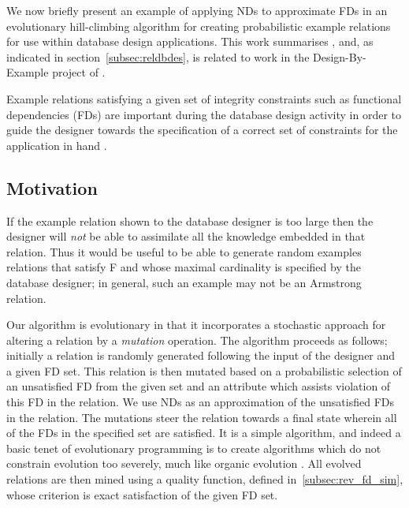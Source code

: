 We now briefly present an example of applying NDs to approximate FDs
in an evolutionary hill-climbing algorithm for creating probabilistic
example relations for use within database design applications. This
work summarises \cite{cl98}, and, as indicated in
section~\ref{subsec:reldbdes}, is related to work in the
Design-By-Example project of \cite{mr86}.

\smallskip

Example relations satisfying a given set of integrity constraints such as 
functional dependencies (FDs) are important during the database design 
activity in order to guide the designer towards the specification of a correct 
set of constraints for the application in hand \cite{sm81}. 



\subsection{Motivation}

If the example relation shown to the database designer is too large then 
the designer will {\em not} be able to assimilate all the knowledge embedded in
that relation. Thus it would be useful to be able to generate random examples 
relations that satisfy F and whose maximal cardinality is specified by the 
database designer; in general, such an example may not be an Armstrong
relation.

\smallskip

Our algorithm is evolutionary in that it incorporates a stochastic approach
for altering a relation by a {\em mutation} operation.
 The algorithm proceeds as
follows; initially a relation is randomly generated following
the input of the designer and a given FD set. This relation is then
 mutated based on a probabilistic selection of an unsatisfied FD  from the
given set and an attribute which assists violation of this FD in the relation.
We use NDs as an
approximation of the unsatisfied FDs in the relation. 
The mutations steer the relation
towards a final state wherein all of the FDs in the specified set are
satisfied. It is a simple algorithm, and indeed a basic tenet 
of evolutionary programming is to create algorithms 
which do not constrain evolution too severely,
 much like organic evolution \cite{bs93}. All evolved relations are then mined 
using a quality function, defined in~\ref{subsec:rev_fd_sim}, whose criterion is exact satisfaction of the given FD set. 

\smallskip

